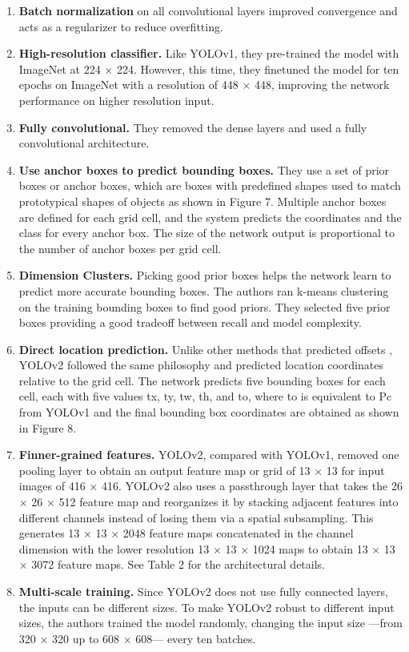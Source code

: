 \documentclass{article}
\begin{document}
\begin{enumerate}
    \item \textbf{Batch normalization} on all convolutional layers improved convergence and acts as a regularizer to reduce overfitting.
    \item \textbf{High-resolution classifier.} Like YOLOv1, they pre-trained the model with ImageNet at 224 × 224. However, this time, they finetuned the model for ten epochs on ImageNet with a resolution of 448 × 448, improving the network performance on higher resolution input.
    \item \textbf{Fully convolutional.} They removed the dense layers and used a fully convolutional architecture.
    \item \textbf{Use anchor boxes to predict bounding boxes.} They use a set of prior boxes or anchor boxes, which are boxes with predefined shapes used to match prototypical shapes of objects as shown in Figure 7. Multiple anchor boxes are defined for each grid cell, and the system predicts the coordinates and the class for every anchor box. The size of the network output is proportional to the number of anchor boxes per grid cell.
    \item \textbf{Dimension Clusters.} Picking good prior boxes helps the network learn to predict more accurate bounding boxes. The authors ran k-means clustering on the training bounding boxes to find good priors. They selected five prior boxes providing a good tradeoff between recall and model complexity.
    \item \textbf{Direct location prediction.} Unlike other methods that predicted offsets \cite{faster_RCNN}, YOLOv2 followed the same philosophy and predicted location coordinates relative to the grid cell. The network predicts five bounding boxes for each cell, each with five values tx, ty, tw, th, and to, where to is equivalent to Pc from YOLOv1 and the final bounding box coordinates are obtained as shown in Figure 8.
    \item \textbf{Finner-grained features.} YOLOv2, compared with YOLOv1, removed one pooling layer to obtain an output feature map or grid of 13 × 13 for input images of 416 × 416. YOLOv2 also uses a passthrough layer that takes the 26 × 26 × 512 feature map and reorganizes it by stacking adjacent features into different channels instead of losing them via a spatial subsampling. This generates 13 × 13 × 2048 feature maps concatenated in the channel dimension with the lower resolution 13 × 13 × 1024 maps to obtain 13 × 13 × 3072 feature maps. See Table 2 for the architectural details.
    \item \textbf{Multi-scale training.} Since YOLOv2 does not use fully connected layers, the inputs can be different sizes. To make YOLOv2 robust to different input sizes, the authors trained the model randomly, changing the input size —from 320 × 320 up to 608 × 608— every ten batches.
\end{enumerate}
\end{document}
